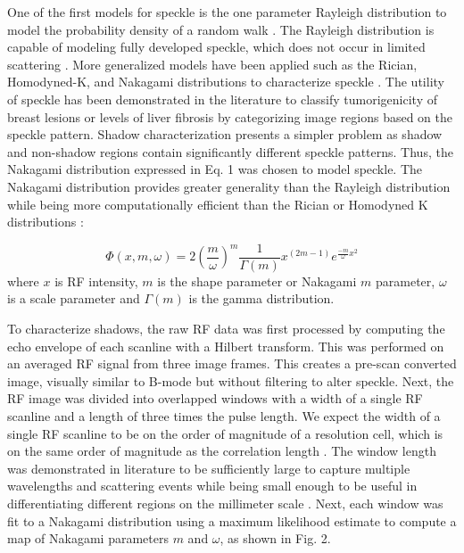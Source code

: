 \documentclass[authoryear,preprint,review,12pt]{elsarticle}
\begin{document}
One of the first models for speckle is the one parameter Rayleigh distribution to model the probability density of a random walk \citep{Burckhardt1978}. The Rayleigh distribution is capable of modeling fully developed speckle, which does not occur in limited scattering \citep{Tuthill1988}. More generalized models have been applied such as the Rician, Homodyned-K, and Nakagami distributions to characterize speckle \citep{Destrempes2010}. The utility of speckle has been demonstrated in the literature to classify tumorigenicity of breast lesions \citep{Byra2016} or levels of liver fibrosis \citep{Ho2012} by categorizing image regions based on the speckle pattern. Shadow characterization presents a simpler problem as shadow and non-shadow regions contain significantly different speckle patterns. Thus, the Nakagami distribution expressed in Eq. 1 was chosen to model speckle. The Nakagami distribution provides greater generality than the Rayleigh distribution while being more computationally efficient than the Rician or Homodyned K distributions \citep{Destrempes2010}:

\begin{equation}
\Phi(x,m,\omega) = 2(\frac{m}{\omega})^{m}\frac{1}{\Gamma(m)}x^{(2m-1)}e^{\frac{-m}{\omega}x^{2}}
\end{equation}where $x$ is RF intensity, $m$ is the shape parameter or Nakagami $m$ parameter, $\omega$ is a scale parameter and $\Gamma(m)$ is the gamma distribution.

To characterize shadows, the raw RF data was first processed by computing the echo envelope of each scanline with a Hilbert transform. This was performed on an averaged RF signal from three image frames. This creates a pre-scan converted image, visually similar to B-mode but without filtering to alter speckle. Next, the RF image was divided into overlapped windows with a width of a single RF scanline and a length of three times the pulse length. We expect the width of a single RF scanline to be on the order of magnitude of a resolution cell, which is on the same order of magnitude as the correlation length \citep{Wagner1988}. The window length was demonstrated in literature to be sufficiently large to capture multiple wavelengths and scattering events while being small enough to be useful in differentiating different regions on the millimeter scale \citep{Byra2016}. Next, each window was fit to a Nakagami distribution using a maximum likelihood estimate to compute a map of Nakagami parameters $m$ and $\omega$, as shown in Fig. 2.
\end{document}
